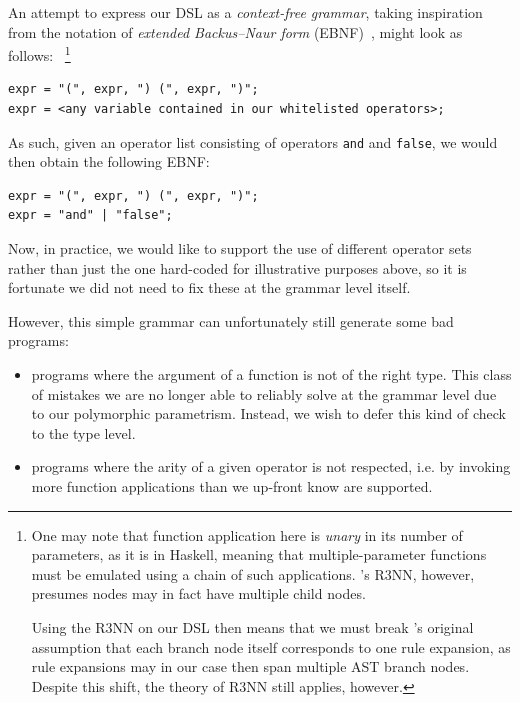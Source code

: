 \documentclass{article}
\begin{document}
An attempt to express our DSL
as a \emph{context-free grammar},
taking inspiration from the notation of \emph{extended Backus–Naur form} (EBNF)~\citep{standard1996ebnf},
might look as follows:
~\footnote{
    One may note that function application here is \emph{unary} in its number of parameters, as it is in Haskell,
    meaning that multiple-parameter functions must be emulated using a chain of such applications.
    \citet{nsps}'s R3NN, however, presumes nodes may in fact have multiple child nodes.

    Using the R3NN on our DSL then means that we must break \citet{nsps}'s original
    assumption that each branch node itself corresponds to one rule expansion,
    as rule expansions may in our case then span multiple AST branch nodes.
    Despite this shift, the theory of R3NN still applies, however.
}

\begin{verbatim}
expr = "(", expr, ") (", expr, ")";
expr = <any variable contained in our whitelisted operators>;
\end{verbatim}

As such, given an operator list consisting of operators \verb|and| and \verb|false|,
we would then obtain the following EBNF:

\begin{verbatim}
expr = "(", expr, ") (", expr, ")";
expr = "and" | "false";
\end{verbatim}


Now, in practice, we would like to support the use of different operator sets
rather than just the one hard-coded for illustrative purposes above,
so it is fortunate we did not need to fix these at the grammar level itself.

However, this simple grammar can unfortunately still generate some bad programs:
\begin{itemize}
    \item programs where the argument of a function is not of the right type.
        This class of mistakes we are no longer able to reliably solve
        at the grammar level due to our polymorphic parametrism.
        Instead, we wish to defer this kind of check to the type level.
    \item programs where the arity of a given operator is not respected, i.e.
        by invoking more function applications than we up-front know are supported.
\end{itemize}
\end{document}

